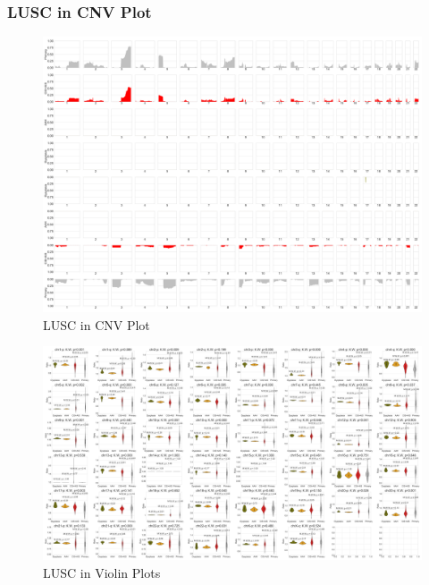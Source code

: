 \documentclass{beamer}
\begin{document}
    \begin{frame}[allowframebreaks]
        \frametitle{LUSC in CNV Plot}

        \begin{figure}
            \includegraphics[width=0.6 \linewidth]{figures/Sequenza/BWA-simple-SQC.pdf}
            \caption{LUSC in CNV Plot}
        \end{figure}

        \begin{figure}
            \includegraphics[width=0.8 \linewidth]{figures/Sequenza/BWA-violin-SQC.pdf}
            \caption{LUSC in Violin Plots}
        \end{figure}
    \end{frame}
\end{document}
